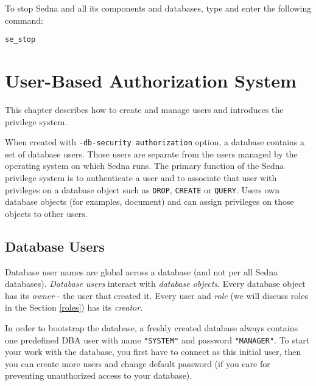 \documentclass[a4paper,12pt]{article}
\begin{document}
To stop Sedna and all its components and databases, type and enter the following
command:

\begin{verbatim}
se_stop
\end{verbatim}

\section{User-Based Authorization System}

This chapter describes how to create and manage users and introduces the
privilege system.

When created with \verb!-db-security authorization! option, a database contains
a set of database users. Those users are separate from the users managed by the
operating system on which Sedna runs. The primary function of the Sedna
privilege system is to authenticate a user and to associate that user with
privileges on a database object such as \verb!DROP!, \verb!CREATE! or
\verb!QUERY!. Users own database objects (for examples, document) and can
assign privileges on those objects to other users.


\subsection{Database Users}

Database user names are global across a database (and not per all Sedna
databases). \emph{Database users} interact with \emph{database objects}. Every
database object has its \emph{owner} - the user that created it. Every user and
\emph{role} (we will discuss roles in the Section \ref{roles}) has its
\emph{creator}.

In order to bootstrap the database, a freshly created database always contains
one predefined DBA user with name \verb!"SYSTEM"! and password \verb!"MANAGER"!.
To start your work with the database, you first have to connect as this initial
user, then you can create more users and change default password (if you care
for preventing unauthorized access to your database).
\end{document}
